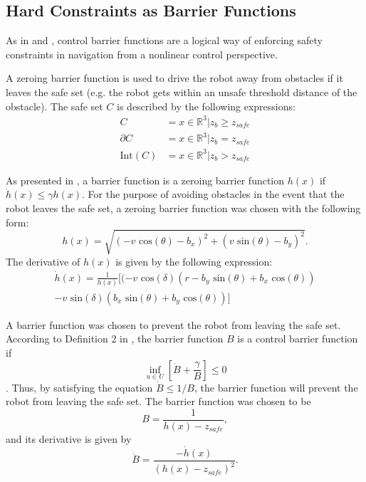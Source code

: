 \documentclass[journal]{IEEEtran}
\begin{document}
\subsection{Hard Constraints as Barrier Functions}
As in \cite{amesACC} and \cite{ames2014esclf}, control barrier functions are a logical way of enforcing safety constraints in navigation from a nonlinear control perspective. 

A zeroing barrier function is used to drive the robot away from obstacles if it leaves the safe set (e.g. the robot gets within an unsafe threshold distance of the obstacle). The safe set $C$ is described by the following expressions:
\begin{align}
C &= {x \in \mathbb{R}^3 | z_b\geq z_{safe}}\\
\partial C &= {x \in \mathbb{R}^3 | z_b=z_{safe}}\\
\text{Int}(C) &= {x \in \mathbb{R}^3 | z_b > z_{safe}}
\end{align}

As presented in \cite{ames2015robust}, a barrier function is a zeroing barrier function $h(x)$ if $\dot{h}(x)\leq \gamma h(x).$ For the purpose of avoiding obstacles in the event that the robot leaves the safe set, a zeroing barrier function was chosen with the following form:
\begin{equation}
h(x)=\sqrt{(-v\text{ cos}(\theta)-b_x)^2+(v\text{ sin}(\theta)-b_y)^2}.
\end{equation}
The derivative of $h(x)$ is given by the following expression:
\begin{equation}
\begin{split}
\dot{h}(x)=\frac{1}{h(x)}[(-v\text{ cos}(\delta)(r-b_y\text{ sin}(\theta)+b_x\text{ cos}(\theta)) \\
-v\text{ sin}(\delta)(b_x\text{ sin}(\theta)+b_y\text{ cos}(\theta))]
\end{split}
\label{zbf}
\end{equation}

A barrier function was chosen to prevent the robot from leaving the safe set. According to Definition 2 in \cite{amesACC}, the barrier function $B$ is a control barrier function if 
\begin{equation}
\inf_{u\in U}\left[ \dot{B}+\frac{\gamma}{B} \right] \leq 0
\label{eq:cbf}
\end{equation}. Thus, by satisfying the equation $\dot{B}\leq 1/B$, the barrier function will prevent the robot from leaving the safe set. The barrier function was chosen to be
\begin{equation}
B=\frac{1}{h(x)-z_{safe}},
\label{bf}
\end{equation}
and its derivative is given by
\begin{equation}
\dot{B}=\frac{-\dot{h}(x)}{(h(x)-z_{safe})^2}.
\end{equation}
\end{document}
